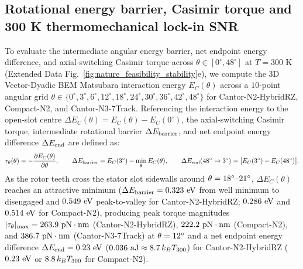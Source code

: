 \documentclass[pdflatex,sn-nature]{sn-jnl}
\DeclareRobustCommand{\roundone}[1]{\fpeval{round(#1,1)}}
\DeclareRobustCommand{\roundtwo}[1]{\fpeval{round(#1,2)}}
\DeclareRobustCommand{\roundthree}[1]{\fpeval{round(#1,3)}}
\begin{document}
\subsection*{Rotational energy barrier, Casimir torque and 300 K thermomechanical lock-in SNR}
To evaluate the intermediate angular energy barrier, net endpoint energy difference, and axial-switching Casimir torque across $\theta \in [0^\circ, 48^\circ]$ at $T = 300\text{ K}$ (Extended Data Fig.~\ref{fig:nature_feasibility_stability}e), we compute the 3D Vector-Dyadic BEM Matsubara interaction energy $E_C(\theta)$ across a $10$-point angular grid $\theta \in \{0^\circ, 3^\circ, 6^\circ, 12^\circ, 18^\circ, 24^\circ, 30^\circ, 36^\circ, 42^\circ, 48^\circ\}$ for Cantor-N2-HybridRZ, Compact-N2, and Cantor-N3-7Track. Referencing the interaction energy to the open-slot centre $\Delta E_C(\theta) = E_C(\theta) - E_C(0^\circ)$, the axial-switching Casimir torque, intermediate rotational barrier $\Delta E_{\rm barrier}$, and net endpoint energy difference $\Delta E_{\rm end}$ are defined as:
\begin{equation}
\tau_\theta(\theta) = -\frac{\partial E_C(\theta)}{\partial \theta}, \qquad
\Delta E_{\rm barrier} = E_C(3^\circ) - \min_{\theta} E_C(\theta), \qquad
\Delta E_{\rm end}(48^\circ \to 3^\circ) = \bigl|E_C(3^\circ) - E_C(48^\circ)\bigr|.
\label{eq:methods_rotational_torque}
\end{equation}
As the rotor teeth cross the stator slot sidewalls around $\theta = 18{}^\circ\text{--}21^\circ$, $\Delta E_C(\theta)$ reaches an attractive minimum ($\Delta E_{\rm barrier} = \roundthree{\NatureCantorNtwoHybridrzRotationalEnergyBarrierSwitchingBarrierFromMinToDisengagedEv}\text{ eV}$ from well minimum to disengaged and $\roundthree{\NatureCantorNtwoHybridrzRotationalEnergyBarrierSwitchingBarrierPeakToValleyEv}\text{ eV}$ peak-to-valley for Cantor-N2-HybridRZ; $\roundthree{\NatureRotCeightCompactNtwoRotationalEnergyBarrierSwitchingBarrierFromMinToDisengagedEv}\text{ eV}$ and $\roundthree{\NatureRotCeightCompactNtwoRotationalEnergyBarrierSwitchingBarrierPeakToValleyEv}\text{ eV}$ for Compact-N2), producing peak torque magnitudes $|\tau_\theta|_{\max} = \roundone{\NatureCantorNtwoHybridrzPeakTorquePnNm}\text{ pN}\cdot\text{nm}$ (Cantor-N2-HybridRZ), $\roundone{\NatureRotCeightCompactNtwoPeakTorquePnNm}\text{ pN}\cdot\text{nm}$ (Compact-N2), and $\roundone{\NatureFractalNthreeCantorseventrackPeakTorquePnNm}\text{ pN}\cdot\text{nm}$ (Cantor-N3-7Track) at $\theta = 12{}^\circ$ and a net endpoint energy difference $\Delta E_{\rm end} = \roundtwo{\NatureCantorNtwoHybridrzRotationalEnergyBarrierSwitchingWorkEv}\text{ eV}$ ($\roundthree{\NatureCantorNtwoHybridrzRotationalEnergyBarrierSwitchingWorkAj}\text{ aJ} \approx \roundone{\NatureCantorNtwoHybridrzRotationalEnergyBarrierSwitchingWorkOverKbtthreezerozero}\,k_B T_{300}$) for Cantor-N2-HybridRZ ($\roundtwo{\NatureRotCeightCompactNtwoRotationalEnergyBarrierSwitchingWorkEv}\text{ eV}$ or $\roundone{\NatureRotCeightCompactNtwoRotationalEnergyBarrierSwitchingWorkOverKbtthreezerozero}\,k_B T_{300}$ for Compact-N2).
\end{document}
